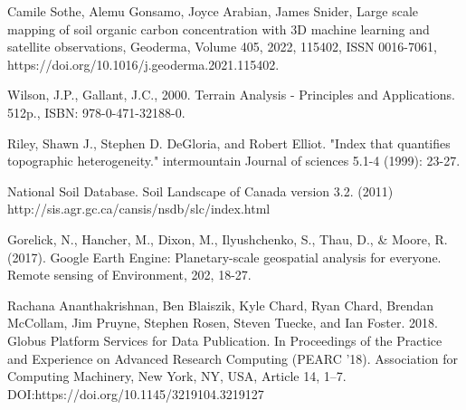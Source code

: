 \documentclass[times,final]{elsarticle}
\begin{document}
\begin{thebibliography}{0}
 Camile Sothe, Alemu Gonsamo, Joyce Arabian, James Snider,
Large scale mapping of soil organic carbon concentration with 3D machine learning and satellite observations, Geoderma, Volume 405, 2022, 115402, ISSN 0016-7061,
https://doi.org/10.1016/j.geoderma.2021.115402.

 Wilson, J.P., Gallant, J.C., 2000. Terrain Analysis - Principles and Applications. 512p., ISBN: 978-0-471-32188-0.

 Riley, Shawn J., Stephen D. DeGloria, and Robert Elliot. "Index that quantifies topographic heterogeneity." intermountain Journal of sciences 5.1-4 (1999): 23-27.

 National Soil Database. Soil Landscape of Canada version 3.2. (2011) \newline
http://sis.agr.gc.ca/cansis/nsdb/slc/index.html

 Gorelick, N., Hancher, M., Dixon, M., Ilyushchenko, S., Thau, D., & Moore, R. (2017). Google Earth Engine: Planetary-scale geospatial analysis for everyone. Remote sensing of Environment, 202, 18-27.

 Rachana Ananthakrishnan, Ben Blaiszik, Kyle Chard, Ryan Chard, Brendan McCollam, Jim Pruyne, Stephen Rosen, Steven Tuecke, and Ian Foster. 2018. Globus Platform Services for Data Publication. In Proceedings of the Practice and Experience on Advanced Research Computing (PEARC '18). Association for Computing Machinery, New York, NY, USA, Article 14, 1–7. DOI:https://doi.org/10.1145/3219104.3219127





\end{thebibliography}
\end{document}
